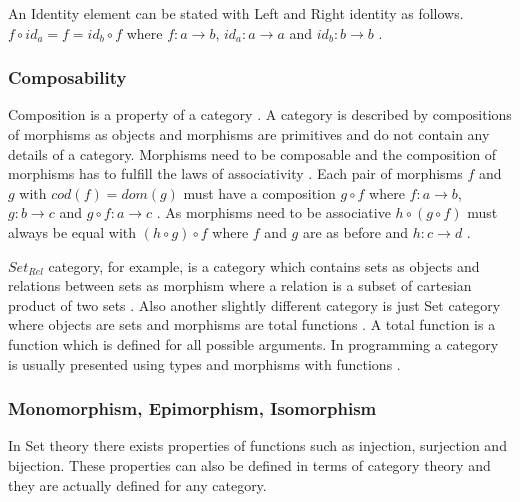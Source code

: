 \documentclass[article]{aaltoseries}
\begin{document}
    An Identity element can be stated with Left and Right identity as follows.
    $f \circ id_a = f = id_b \circ f$ where $f: a \rightarrow b$, $id_a: a
    \rightarrow a$ and $id_b: b \rightarrow b$ \cite{computational, barr1990category}.


  \subsubsection{Composability}
    Composition is a property of a category \cite{barr1990category,
      mac2013categories}. A category is described by compositions of morphisms
    as objects and morphisms are primitives and do not contain any details of a
    category. Morphisms need to be composable and the composition of morphisms
    has to fulfill the laws of associativity \cite{barr1990category,
      computational, mac2013categories}. Each pair of morphisms $f$ and $g$ with
    $cod(f) = dom(g)$ must have a composition $g \circ f$ where $f: a
    \rightarrow b$, $g: b \rightarrow c$ and $g \circ f: a \rightarrow c$
    \cite{mac2013categories}. As morphisms need to be associative $h \circ (g
    \circ f)$ must always be equal with $(h \circ g) \circ f$ where $f$ and $g$
    are as before and $h: c \rightarrow d$ \cite{eilenberg1945general,
      computational, barr1990category, awodey2006category, mac2013categories}.
 
    $Set_{Rel}$ category, for example, is a category which contains sets as
    objects and relations between sets as morphism where a relation is a subset
    of cartesian product of two sets \cite{computational}. Also another slightly
    different category is just Set category where objects are sets and morphisms
    are total functions \cite{barr1990category, computational}. A total function
    is a function which is defined for all possible arguments. In programming a
    category is usually presented using types and morphisms with functions
    \cite{computational}.


  \subsubsection{Monomorphism, Epimorphism, Isomorphism}
    In Set theory there exists properties of functions such as injection,
    surjection and bijection. These properties can also be defined in terms of
    category theory and they are actually defined for any category.
\end{document}
